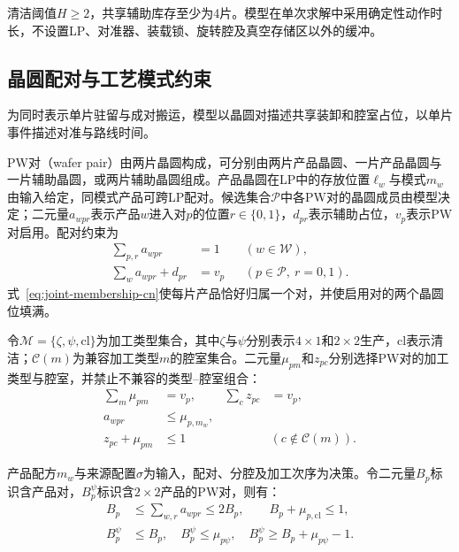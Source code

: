 \documentclass[final,5p,times,twocolumn]{elsarticle}
\begin{document}
清洁阈值$H\ge2$，共享辅助库存至少为4片。模型在单次求解中采用确定性动作时长，不设置LP、对准器、装载锁、旋转腔及真空存储区以外的缓冲。

\subsection{晶圆配对与工艺模式约束}

为同时表示单片驻留与成对搬运，模型以晶圆对描述共享装卸和腔室占位，以单片事件描述对准与路线时间。

PW对（wafer pair）由两片晶圆构成，可分别由两片产品晶圆、一片产品晶圆与一片辅助晶圆，或两片辅助晶圆组成。产品晶圆在LP中的存放位置$\ell_w$与模式$m_w$由输入给定，同模式产品可跨LP配对。候选集合$\mathcal P$中各PW对的晶圆成员由模型决定；二元量$a_{wpr}$表示产品$w$进入对$p$的位置$r\in\{0,1\}$，$d_{pr}$表示辅助占位，$v_p$表示PW对启用。配对约束为
\begin{equation}
\begin{aligned}
\sum_{p,r}a_{wpr}&=1 &&(w\in\mathcal W),\\
\sum_w a_{wpr}+d_{pr}&=v_p &&(p\in\mathcal P,\ r=0,1).
\end{aligned}
\label{eq:joint-membership-cn}
\end{equation}
式~\eqref{eq:joint-membership-cn}使每片产品恰好归属一个对，并使启用对的两个晶圆位填满。

令$\mathcal M=\{\zeta,\psi,\mathrm{cl}\}$为加工类型集合，其中$\zeta$与$\psi$分别表示$4\times1$和$2\times2$生产，$\mathrm{cl}$表示清洁；$\mathcal C(m)$为兼容加工类型$m$的腔室集合。二元量$\mu_{pm}$和$z_{pc}$分别选择PW对的加工类型与腔室，并禁止不兼容的类型--腔室组合：
\begin{equation}
\begin{aligned}
\sum_m\mu_{pm}&=v_p, &\sum_c z_{pc}&=v_p,\\
a_{wpr}&\le\mu_{p,m_w},\\
z_{pc}+\mu_{pm}&\le1 &&(c\notin\mathcal C(m)).
\end{aligned}
\label{eq:joint-chamber-cn}
\end{equation}

产品配方$m_w$与来源配置$\sigma$为输入，配对、分腔及加工次序为决策。令二元量$B_p$标识含产品对，$B_p^{\psi}$标识含$2\times2$产品的PW对，则有：
\begin{equation}
\begin{aligned}
B_p&\le\sum_{w,r}a_{wpr}\le2B_p,\qquad B_p+\mu_{p,\mathrm{cl}}\le1,\\
B_p^{\psi}&\le B_p,\quad B_p^{\psi}\le\mu_{p\psi},\quad
B_p^{\psi}\ge B_p+\mu_{p\psi}-1.
\end{aligned}
\label{eq:pair-type-cn}
\end{equation}
\end{document}
